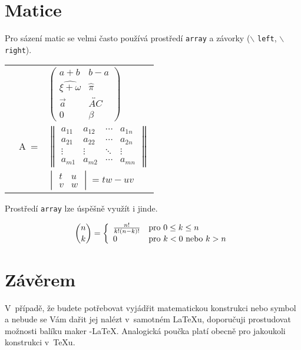 \documentclass[11pt,a4paper,twocolumn]{article}
\theoremstyle{plain}
\theoremstyle{definition}
\theoremstyle{plain}
\begin{document}
  \section{Matice}

    Pro sázení matic se velmi často používá prostředí \texttt{array} a závorky
    ($\backslash$ \texttt{left}, $\backslash$ \texttt{right}). 
    \newpage

    \begin{tabular}{l r l}

      & & $
      \begin{pmatrix}
        a+b                  & b-a                     \\
        \widehat{\xi+\omega} & \hat{\pi}               \\
        \overrightarrow{a}   & \overleftrightarrow{AC} \\
        0                    & \beta
      \end{pmatrix}$ \\[11mm]

      & A~= & $
      \begin{Vmatrix}
        a_{11} & a_{12} & \cdots & a_{1n} \\
        a_{21} & a_{22} & \cdots & a_{2n} \\
        \vdots & \vdots & \ddots & \vdots \\
        a_{m1} & a_{m2} & \cdots & a_{mn}
      \end{Vmatrix}$ \\[11mm]
       
      & & $
      \begin{vmatrix}
        t & u \\
        v & w         
      \end{vmatrix} = tw - uv$\\[5mm]

    \end{tabular}

    Prostředí \texttt{array} lze úspěšně využít i jinde.

    $$ \binom{n}{k} = \left\{
    \begin{array}{l l}
      \frac{n!}{k!(n-k)!} & \text{pro } 0 \leq k \leq n \\
      0 & \text{pro } k < 0 \text{ nebo } k > n
    \end{array} \right. $$

  \section{Závěrem}

    V~případě, že budete potřebovat vyjádřit matematickou konstrukci nebo symbol
    a nebude se Vám dařit jej nalézt v~samotném \LaTeX u, doporučuji prostudovat
    možnosti balíku maker \AmS-\LaTeX.
    Analogická poučka platí obecně pro jakoukoli konstrukci v~\TeX u.
\end{document}
